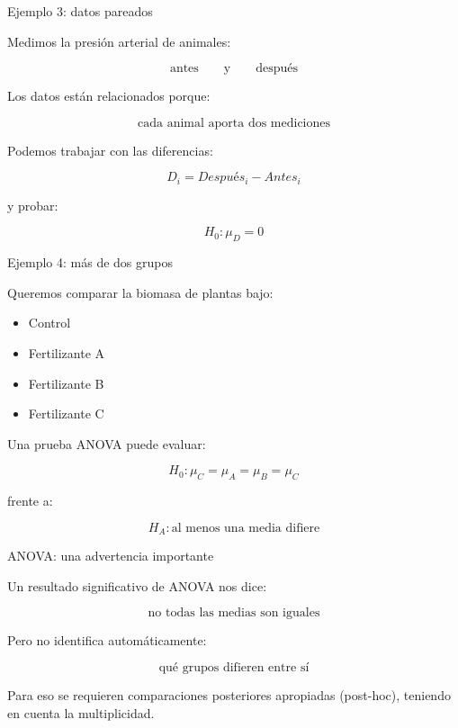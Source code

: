 \documentclass[aspectratio=169,11pt]{beamer}
\begin{document}
\begin{frame}{Ejemplo 3: datos pareados}

Medimos la presión arterial de animales:

\[
\text{antes}
\qquad\text{y}\qquad
\text{después}
\]

Los datos están relacionados porque:

\[
\boxed{\text{cada animal aporta dos mediciones}}
\]

Podemos trabajar con las diferencias:

\[
D_i=Después_i-Antes_i
\]

y probar:

\[
H_0:\mu_D=0
\]

\end{frame}

\begin{frame}{Ejemplo 4: más de dos grupos}

Queremos comparar la biomasa de plantas bajo:

\begin{itemize}
    \item Control
    \item Fertilizante A
    \item Fertilizante B
    \item Fertilizante C
\end{itemize}

Una prueba ANOVA puede evaluar:

\[
H_0:
\mu_C=\mu_A=\mu_B=\mu_C
\]

frente a:

\[
H_A:\text{al menos una media difiere}
\]

\end{frame}

\begin{frame}{ANOVA: una advertencia importante}

Un resultado significativo de ANOVA nos dice:

\[
\boxed{\text{no todas las medias son iguales}}
\]

Pero no identifica automáticamente:

\[
\text{qué grupos difieren entre sí}
\]

Para eso se requieren comparaciones posteriores apropiadas
(post-hoc), teniendo en cuenta la multiplicidad.

\end{frame}
\end{document}
